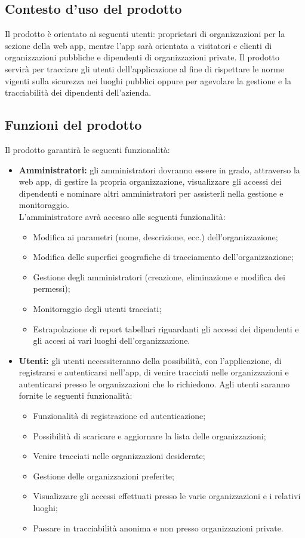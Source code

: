 \subsection{Contesto d'uso del prodotto}
Il prodotto è orientato ai seguenti utenti: proprietari di organizzazioni per la sezione della web app, mentre l'app sarà orientata a visitatori e clienti di organizzazioni pubbliche e dipendenti di organizzazioni private.
Il prodotto servirà per tracciare gli utenti dell'applicazione al fine di rispettare le norme vigenti sulla sicurezza nei luoghi pubblici oppure per agevolare la gestione e la tracciabilità dei dipendenti dell'azienda.

\subsection{Funzioni del prodotto}
Il prodotto garantirà le seguenti funzionalità:
\begin{itemize}
    \item \textbf{Amministratori:} gli amministratori dovranno essere in grado, attraverso la web app, di gestire la propria organizzazione, visualizzare gli accessi dei dipendenti e nominare altri amministratori per assisterli nella gestione e monitoraggio. \\
        L'amministratore avrà accesso alle seguenti funzionalità:
        \begin{itemize}
            \item Modifica ai parametri (nome, descrizione, ecc.) dell'organizzazione;
            \item Modifica delle superfici geografiche di tracciamento dell'organizzazione;
            \item Gestione degli amministratori (creazione, eliminazione e modifica dei permessi);
            \item Monitoraggio degli utenti tracciati;
            \item Estrapolazione di report tabellari riguardanti gli accessi dei dipendenti e gli accesi ai vari luoghi dell'organizzazione.
        \end{itemize}
    \item \textbf{Utenti:} gli utenti necessiteranno della possibilità, con l'applicazione, di registrarsi e autenticarsi nell'app, di venire tracciati nelle organizzazioni e autenticarsi presso le organizzazioni che lo richiedono. Agli utenti saranno fornite le seguenti funzionalità:
    \begin{itemize}
        \item Funzionalità di registrazione ed autenticazione;
        \item Possibilità di scaricare e aggiornare la lista delle organizzazioni;
        \item Venire tracciati nelle organizzazioni desiderate;
        \item Gestione delle organizzazioni preferite;
        \item Visualizzare gli accessi effettuati presso le varie organizzazioni e i relativi luoghi;
        \item Passare in tracciabilità anonima e non presso organizzazioni private.
    \end{itemize}
\end{itemize}
